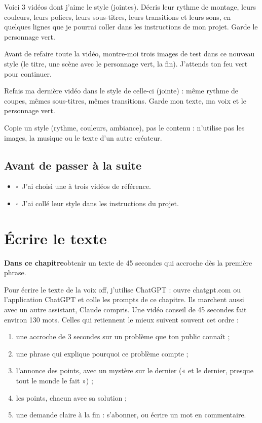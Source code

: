 \documentclass[11pt,oneside,openany]{book}
\newcommand{\coche}{$\square$\ }
\newcommand{\objectif}[1]{\begin{tcolorbox}[enhanced,colback=encre,colframe=encre,arc=2pt,boxrule=0pt,left=9pt,right=9pt,top=6pt,bottom=6pt,fontupper=\small\color{white}]{\color{citron}\bfseries Dans ce chapitre}\quad #1\end{tcolorbox}}
\newenvironment{bilan}{\section*{Avant de passer à la suite}\begin{itemize}[label={}]}{\end{itemize}}
\begin{document}
\begin{acopier}
Voici 3 vidéos dont j'aime le style (jointes). Décris leur rythme de montage, leurs couleurs, leurs polices, leurs sous-titres, leurs transitions et leurs sons, en quelques lignes que je pourrai coller dans les instructions de mon projet. Garde le personnage vert.
\end{acopier}
\begin{acopier}
Avant de refaire toute la vidéo, montre-moi trois images de test dans ce nouveau style (le titre, une scène avec le personnage vert, la fin). J'attends ton feu vert pour continuer.
\end{acopier}
\begin{acopier}
Refais ma dernière vidéo dans le style de celle-ci (jointe) : même rythme de coupes, mêmes sous-titres, mêmes transitions. Garde mon texte, ma voix et le personnage vert.
\end{acopier}

\begin{attention}
Copie un style (rythme, couleurs, ambiance), pas le contenu : n'utilise pas les images, la musique ou le texte d'un autre créateur.
\end{attention}

\begin{bilan}
  \item \coche J'ai choisi une à trois vidéos de référence.
  \item \coche J'ai collé leur style dans les instructions du projet.
\end{bilan}

\chapter{Écrire le texte}
\objectif{obtenir un texte de 45 secondes qui accroche dès la première phrase.}
Pour écrire le texte de la voix off, j'utilise ChatGPT : ouvre chatgpt.com ou l'application ChatGPT et colle les prompts de ce chapitre. Ils marchent aussi avec un autre assistant, Claude compris. Une vidéo conseil de 45 secondes fait environ 130 mots. Celles qui retiennent le mieux suivent souvent cet ordre :
\begin{enumerate}
  \item une accroche de 3 secondes sur un problème que ton public connaît ;
  \item une phrase qui explique pourquoi ce problème compte ;
  \item l'annonce des points, avec un mystère sur le dernier (« et le dernier, presque tout le monde le fait ») ;
  \item les points, chacun avec sa solution ;
  \item une demande claire à la fin : s'abonner, ou écrire un mot en commentaire.
\end{enumerate}
\end{document}
